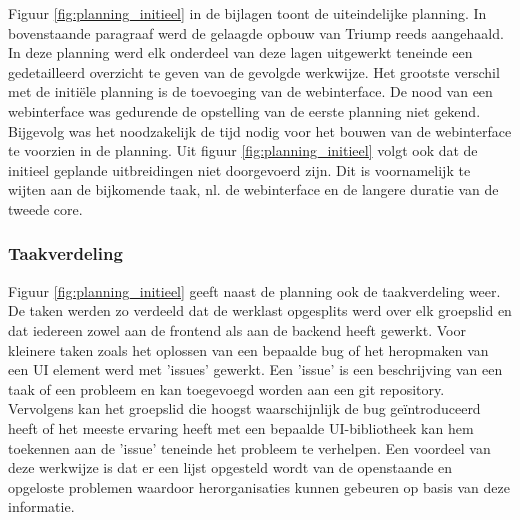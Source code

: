 Figuur \ref{fig:planning_initieel} in de bijlagen toont de uiteindelijke planning. In bovenstaande paragraaf werd de gelaagde opbouw van Triump reeds aangehaald. In deze planning werd elk onderdeel van deze lagen uitgewerkt teneinde een gedetailleerd overzicht te geven van de gevolgde werkwijze. Het grootste verschil met de initiële planning is de toevoeging van de webinterface. De nood van een webinterface was gedurende de opstelling van de eerste planning niet gekend. Bijgevolg was het noodzakelijk de tijd nodig voor het bouwen van de webinterface te voorzien in de planning. 
Uit figuur \ref{fig:planning_initieel} volgt ook dat de initieel geplande uitbreidingen niet doorgevoerd zijn. Dit is voornamelijk te wijten aan de bijkomende taak, nl. de webinterface en de langere duratie van de tweede core.

\subsubsection{Taakverdeling}

Figuur \ref{fig:planning_initieel} geeft naast de planning ook de taakverdeling weer. De taken werden zo verdeeld dat de werklast opgesplits werd over elk groepslid en dat iedereen zowel aan de frontend als aan de backend heeft gewerkt. Voor kleinere taken zoals het oplossen van een bepaalde bug of het heropmaken van een UI element werd met 'issues' gewerkt. Een 'issue' is een beschrijving van een taak of een probleem en kan toegevoegd worden aan een git repository. Vervolgens kan het groepslid die hoogst waarschijnlijk de bug geïntroduceerd heeft of het meeste ervaring heeft met een bepaalde UI-bibliotheek kan hem toekennen aan de 'issue' teneinde het probleem te verhelpen. Een voordeel van deze werkwijze is dat er een lijst opgesteld wordt van de openstaande en opgeloste problemen waardoor herorganisaties kunnen gebeuren op basis van deze informatie.


